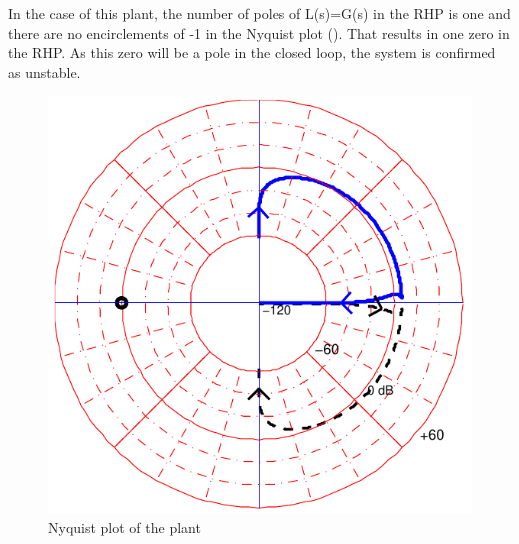 In the case of this plant, the number of poles of L(s)=G(s) in the RHP is one and there are no encirclements of -1 in the Nyquist plot (). That results in one zero in the RHP. As this zero will be a pole in the closed loop, the system is confirmed as unstable.

\begin{figure}[H] 
	\centering 
	\includegraphics[scale=0.6]{figures/nyquistCubli}	
	\caption{Nyquist plot of the plant}
	\label{nyquistCubli}
\end{figure}